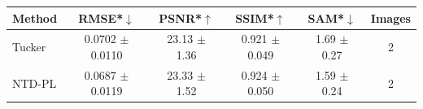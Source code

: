 \begin{tabular}{@{}l c c c c c@{}}
\toprule
Method & RMSE*$\downarrow$ & PSNR*$\uparrow$ & SSIM*$\uparrow$ & SAM*$\downarrow$ & Images\\
\midrule
Tucker & 0.0702 $\pm$ 0.0110 & 23.13 $\pm$ 1.36 & 0.921 $\pm$ 0.049 & 1.69 $\pm$ 0.27 & 2\\
NTD-PL & 0.0687 $\pm$ 0.0119 & 23.33 $\pm$ 1.52 & 0.924 $\pm$ 0.050 & 1.59 $\pm$ 0.24 & 2\\
\bottomrule
\end{tabular}
